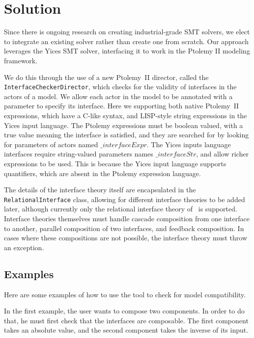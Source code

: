 \documentclass[preprint,11pt]{sigplanconf}
\begin{document}
\section{Solution}
Since there is ongoing research on creating industrial-grade SMT solvers,
we elect to integrate an existing solver rather than create one from scratch.
Our approach leverages the Yices\cite{yices} SMT solver, interfacing it to
work in the Ptolemy II\cite{ptII} modeling framework.

We do this through the use of a new Ptolemy~II director, called the
\texttt{InterfaceCheckerDirector}, which checks for the validity of interfaces
in the actors of a model. We allow each actor in the model to be annotated with
a parameter to specify its interface. Here we supporting both native Ptolemy~II
expressions, which have a C-like syntax, and LISP-style string expressions in
the Yices input language. The Ptolemy expressions must be boolean valued, with
a true value meaning the interface is satisfied, and they are searched for by
looking for parameters of actors named $\_interfaceExpr$. The Yices inputs
language interfaces require string-valued parameters names $\_interfaceStr$,
and allow richer expressions to be used. This is because the Yices input
language supports quantifiers, which are absent in the Ptolemy expression
language.

The details of the interface theory itself are encapsulated in the
\texttt{RelationalInterface} class, allowing for different interface theories
to be added later, although currently only the relational interface theory
of~\cite{relationalInterfaces} is supported. Interface theories themselves must
handle cascade composition from one interface to another, parallel composition
of two interfaces, and feedback composition. In cases where these compositions
are not possible, the interface theory must throw an exception.

\subsection{Examples}
Here are some examples of how to use the tool to check for model compatibility.

In the first example, the user wants to compose two components.
In order to do that, he must first check that the interfaces are composable. 
The first component takes an absolute value, and the second component takes the
inverse of its input.
\end{document}
